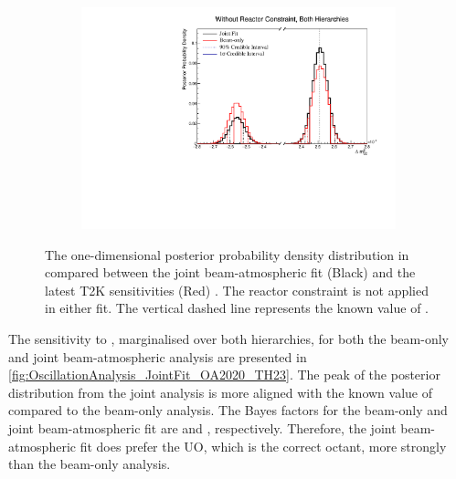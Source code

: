 \begin{figure}[h]
  \begin{subfigure}[t]{0.98\textwidth}
    \includegraphics[width=\textwidth, trim={0mm 0mm 0mm 0mm}, clip,page=1]{Figures/OA/JointFit_OA2020_Comp/ContourComparison_1D_dm32_BH_2_woRC_UnSmeared_CredibleInterval.pdf}
  \end{subfigure}
  \caption{The one-dimensional posterior probability density distribution in  compared between the joint beam-atmospheric fit (Black) and the latest T2K sensitivities (Red) \cite{Dunne2020-uf, t2k_tn_393}. The reactor constraint is not applied in either fit. The vertical dashed line represents the known value of .}
  \label{fig:OscillationAnalysis_JointFit_OA2020_DM32}
\end{figure}

The sensitivity to , marginalised over both hierarchies, for both the beam-only and joint beam-atmospheric analysis are presented in \autoref{fig:OscillationAnalysis_JointFit_OA2020_TH23}. The peak of the posterior distribution from the joint analysis is more aligned with the known value of  compared to the beam-only analysis.
The Bayes factors for the beam-only and joint beam-atmospheric fit are  and , respectively. Therefore, the joint beam-atmospheric fit does prefer the UO, which is the correct octant, more strongly than the beam-only analysis.

